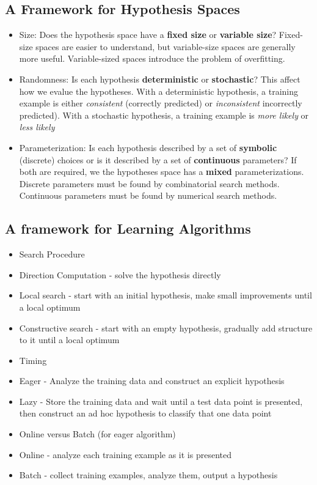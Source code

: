 \subsection{A Framework for Hypothesis Spaces}
\begin{itemize}
  \item Size: Does the hypothesis space have a \textbf{fixed size} or \textbf{variable size}? Fixed-size spaces are easier to understand, but variable-size spaces are generally more useful. Variable-sized spaces introduce the problem of overfitting.
  \item Randomness: Is each hypothesis \textbf{deterministic} or \textbf{stochastic}? This affect how we evalue the hypotheses. With a deterministic hypothesis, a training example is either \emph{consistent} (correctly predicted) or \emph{inconsistent} incorrectly predicted). With a stochastic hypothesis, a training example is \emph{more likely} or \emph{less likely}
  \item Parameterization: Is each hypothesis described by a set of \textbf{symbolic} (discrete) choices or is it described by a set of \textbf{continuous} parameters? If both are required, we the hypotheses space has a \textbf{mixed} parameterizations. Discrete parameters must be found by combinatorial search methods. Continuous parameters must be found by numerical search methods.
\end{itemize}

\subsection{A framework for Learning Algorithms}
\begin{itemize}
  \item Search Procedure
  \item[] Direction Computation - solve the hypothesis directly
  \item[] Local search - start with an initial hypothesis, make small improvements until a local optimum
  \item[] Constructive search - start with an empty hypothesis, gradually add structure to it until a local optimum
  \item Timing
  \item[] Eager - Analyze the training data and construct an explicit hypothesis
  \item[] Lazy - Store the training data and wait until a test data point is presented, then construct an ad hoc hypothesis to classify that one data point
  \item Online versus Batch (for eager algorithm)
  \item[] Online - analyze each training example as it is presented
  \item[] Batch - collect training examples, analyze them, output a hypothesis
\end{itemize}

